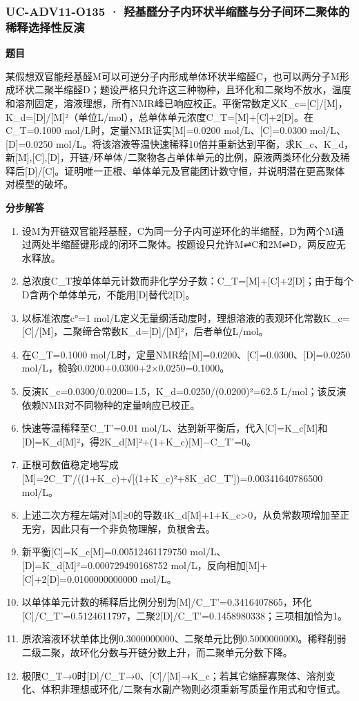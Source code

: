 \documentclass[UTF8,11pt,a4paper]{ctexart}
\begin{document}
\subsubsection*{UC-ADV11-O135 · 羟基醛分子内环状半缩醛与分子间环二聚体的稀释选择性反演}
\noindent\textbf{题目}\par
某假想双官能羟基醛M可以可逆分子内形成单体环状半缩醛C，也可以两分子M形成环状二聚半缩醛D；题设严格只允许这三种物种，且环化和二聚均不放水，温度和溶剂固定，溶液理想，所有NMR峰已响应校正。平衡常数定义K\_c=[C]/[M]，K\_d=[D]/[M]²（单位L/mol），总单体单元浓度C\_T=[M]+[C]+2[D]。在C\_T=0.1000 mol/L时，定量NMR证实[M]=0.0200 mol/L、[C]=0.0300 mol/L、[D]=0.0250 mol/L。将该溶液等温快速稀释10倍并重新达到平衡，求K\_c、K\_d，新[M],[C],[D]，开链/环单体/二聚物各占单体单元的比例，原液两类环化分数及稀释后[D]/[C]。证明唯一正根、单体单元及官能团计数守恒，并说明潜在更高聚体对模型的破坏。\par
\medskip\noindent\textbf{分步解答}
\begin{enumerate}
\item 设M为开链双官能羟基醛，C为同一分子内可逆环化的半缩醛，D为两个M通过两处半缩醛键形成的闭环二聚体。按题设只允许M⇌C和2M⇌D，两反应无水释放。
\item 总浓度C\_T按单体单元计数而非化学分子数：C\_T=[M]+[C]+2[D]；由于每个D含两个单体单元，不能用[D]替代2[D]。
\item 以标准浓度c°=1 mol/L定义无量纲活动度时，理想溶液的表观环化常数K\_c=[C]/[M]，二聚缔合常数K\_d=[D]/[M]²，后者单位L/mol。
\item 在C\_T=0.1000 mol/L时，定量NMR给[M]=0.0200、[C]=0.0300、[D]=0.0250 mol/L，检验0.0200+0.0300+2×0.0250=0.1000。
\item 反演K\_c=0.0300/0.0200=1.5，K\_d=0.0250/(0.0200)²=62.5 L/mol；该反演依赖NMR对不同物种的定量响应已校正。
\item 快速等温稀释至C\_T'=0.01 mol/L、达到新平衡后，代入[C]=K\_c[M]和[D]=K\_d[M]²，得2K\_d[M]²+(1+K\_c)[M]−C\_T'=0。
\item 正根可数值稳定地写成[M]=2C\_T'/((1+K\_c)+√[(1+K\_c)²+8K\_dC\_T'])=0.00341640786500 mol/L。
\item 上述二次方程左端对[M]≥0的导数4K\_d[M]+1+K\_c>0，从负常数项增加至正无穷，因此只有一个非负物理解，负根舍去。
\item 新平衡[C]=K\_c[M]=0.00512461179750 mol/L、[D]=K\_d[M]²=0.000729490168752 mol/L，反向相加[M]+[C]+2[D]=0.0100000000000 mol/L。
\item 以单体单元计数的稀释后比例分别为[M]/C\_T'=0.3416407865，环化[C]/C\_T'=0.5124611797，二聚2[D]/C\_T'=0.1458980338；三项相加恰为1。
\item 原浓溶液环状单体比例0.3000000000、二聚单元比例0.5000000000。稀释削弱二级二聚，故环化分数与开链分数上升，而二聚单元分数下降。
\item 极限C\_T→0时[D]/C\_T→0、[C]/[M]→K\_c；若其它缩醛寡聚体、溶剂变化、体积非理想或环化/二聚有水副产物则必须重新写质量作用式和守恒式。
\end{enumerate}
\end{document}
